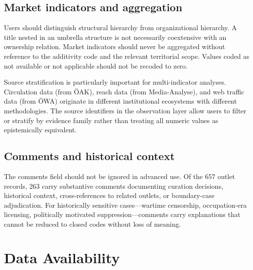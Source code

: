 \documentclass[11pt]{article}
\begin{document}
\subsection{Market indicators and aggregation}

Users should distinguish structural hierarchy from organizational hierarchy. A title nested in an umbrella structure is not necessarily coextensive with an ownership relation. Market indicators should never be aggregated without reference to the additivity code and the relevant territorial scope. Values coded as not available or not applicable should not be recoded to zero.

Source stratification is particularly important for multi-indicator analyses. Circulation data (from \"OAK), reach data (from Media-Analyse), and web traffic data (from \"OWA) originate in different institutional ecosystems with different methodologies. The source identifiers in the observation layer allow users to filter or stratify by evidence family rather than treating all numeric values as epistemically equivalent.

\subsection{Comments and historical context}

The comments field should not be ignored in advanced use. Of the 657 outlet records, 263 carry substantive comments documenting curation decisions, historical context, cross-references to related outlets, or boundary-case adjudication. For historically sensitive cases---wartime censorship, occupation-era licensing, politically motivated suppression---comments carry explanations that cannot be reduced to closed codes without loss of meaning.

\section{Data Availability}
\end{document}

